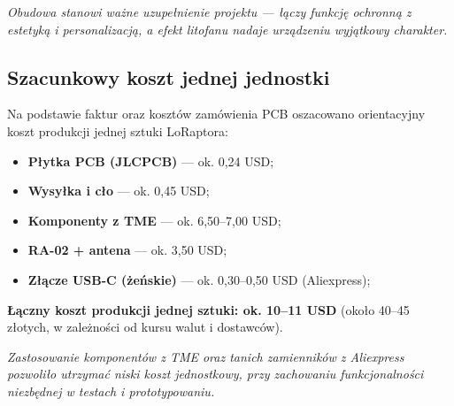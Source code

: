 \begin{tcolorbox}[
	colback=gray!5!white, 
	colframe=gray!75!black, 
	boxrule=0.8pt, 
	arc=5pt,
	enhanced,
	drop shadow,
	top=8pt,
	bottom=8pt,
	center
]
\textit{Obudowa stanowi ważne uzupełnienie projektu — łączy funkcję ochronną z estetyką i personalizacją, a efekt litofanu nadaje urządzeniu wyjątkowy charakter.}
\end{tcolorbox}

\clearpage
\subsection{Szacunkowy koszt jednej jednostki}

Na podstawie faktur oraz kosztów zamówienia PCB oszacowano orientacyjny koszt produkcji jednej sztuki LoRaptora:
\begin{itemize}
	\item \textbf{Płytka PCB (JLCPCB)} — ok. 0,24 USD;
	\item \textbf{Wysyłka i cło} — ok. 0,45 USD;
	\item \textbf{Komponenty z TME} — ok. 6,50–7,00 USD;
	\item \textbf{RA-02 + antena} — ok. 3,50 USD;
	\item \textbf{Złącze USB-C (żeńskie)} — ok. 0,30–0,50 USD (Aliexpress);
\end{itemize}
\textbf{Łączny koszt produkcji jednej sztuki: ok. 10–11 USD}  
(około 40–45 złotych, w zależności od kursu walut i dostawców).

\begin{tcolorbox}[
	colback=gray!5!white, 
	colframe=gray!75!black, 
	boxrule=0.8pt, 
	arc=5pt,
	enhanced,
	drop shadow,
	top=8pt,
	bottom=8pt,
	center
]
\textit{Zastosowanie komponentów z TME oraz tanich zamienników z Aliexpress pozwoliło utrzymać niski koszt jednostkowy, przy zachowaniu funkcjonalności niezbędnej w testach i prototypowaniu.}
\end{tcolorbox}